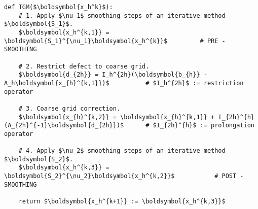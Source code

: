 \documentclass{article}
\begin{document}
\pagestyle{plain}
\lstset{language=Python}
\begin{lstlisting}[mathescape=true]
def TGM($\boldsymbol{x_h^k}$):
	# 1. Apply $\nu_1$ smoothing steps of an iterative method $\boldsymbol{S_1}$.
	$\boldsymbol{x_h^{k,1}} = \boldsymbol{S_1}^{\nu_1}\boldsymbol{x_h^{k}}$			# PRE - SMOOTHING
	
	# 2. Restrict defect to coarse grid.
	$\boldsymbol{d_{2h}} = I_h^{2h}(\boldsymbol{b_{h}} - A_h\boldsymbol{x_{h}^{k,1}})$			# $I_h^{2h}$ := restriction operator
	
	# 3. Coarse grid correction.
	$\boldsymbol{x_{h}^{k,2}} = \boldsymbol{x_{h}^{k,1}} + I_{2h}^{h}(A_{2h}^{-1}\boldsymbol{d_{2h}})$		# $I_{2h}^{h}$ := prolongation operator
	
	# 4. Apply $\nu_2$ smoothing steps of an iterative method $\boldsymbol{S_2}$.
	$\boldsymbol{x_h^{k,3}} = \boldsymbol{S_2}^{\nu_2}\boldsymbol{x_h^{k,2}}$			# POST - SMOOTHING
	
	return $\boldsymbol{x_h^{k+1}} := \boldsymbol{x_h^{k,3}}$
\end{lstlisting}
\end{document}

